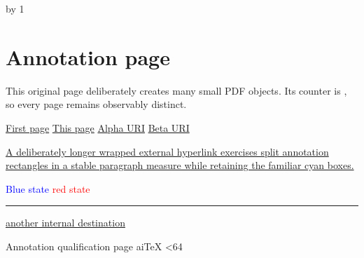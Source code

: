 \documentclass[10pt]{article}
\providecommand{\aitexqualificationpages}{64}
\begin{document}
\hypertarget{annotation-first}{}
\loop
  \advance\aitexannotationpage by 1
  \section{Annotation page \number\aitexannotationpage}
  \hypertarget{annotation-page-\number\aitexannotationpage}{}
  This original page deliberately creates many small PDF objects. Its counter
  is \number\aitexannotationpage, so every page remains observably distinct.\par
  \medskip

  \hyperlink{annotation-first}{First page}\quad
  \hyperlink{annotation-page-\number\aitexannotationpage}{This page}\quad
  \href{https://example.invalid/aitex/alpha}{Alpha URI}\quad
  \href{https://example.invalid/aitex/beta}{Beta URI}\par
  \medskip

  \href{https://example.invalid/aitex/long/path?kind=qualification}{A deliberately
  longer wrapped external hyperlink exercises split annotation rectangles in
  a stable paragraph measure while retaining the familiar cyan boxes.}\par
  \medskip

  \textcolor{blue}{Blue state}\quad
  \textcolor{red}{red state}\quad
  \rule{80pt}{0.6pt}\quad
  \hyperlink{annotation-first}{another internal destination}\par
  \vfill
  Annotation qualification page \number\aitexannotationpage\hfill aiTeX
  \newpage
\ifnum\aitexannotationpage<\aitexqualificationpages
\repeat
\end{document}

